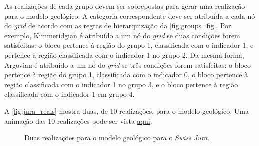 \begin{figure}[H]
\end{figure}

As realizações de cada grupo devem ser sobrepostas para gerar uma realização para o modelo geológico. A categoria correspondente deve ser atribuída a cada nó do \textit{grid} de acordo com as regras de hierarquização da \autoref{fig:groups_fig}. Por exemplo, Kimmeridgian é atribuído a um nó do \textit{grid} se duas condições forem satisfeitas: o bloco pertence à região do grupo 1, classificada com o indicador 1, e pertence à região classificada com o indicador 1 no grupo 2. Da mesma forma, Argovian é atribuído a um nó do \textit{grid} se três condições forem satisfeitas: o bloco pertence à região do grupo 1, classificada com o indicador 0, o bloco pertence à região classificada com o indicador 1 no grupo 3, e o bloco pertence à região classificada com o indicador 1 em grupo 4.

A \autoref{fig:jura_reals} mostra duas, de 10 realizações, para o modelo geológico. Uma animação das 10 realizações pode ser vista \href{https://github.com/robertorolo/hierarchical_boundary_simulation/blob/main/jura_gif.gif}{aqui}.

\begin{figure}[H] 
    \centering
    \caption{Duas realizações para o modelo geológico para o \textit{Swiss Jura}.} \label{fig:jura_reals}
     \hspace{1em}
\end{figure}

